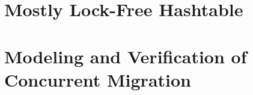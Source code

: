 \documentclass[twoside,12pt]{cslreport}
\begin{document}





\chapter{Mostly Lock-Free Hashtable}
\label{algorithm-details}


\chapter{Modeling and Verification of Concurrent Migration}
\label{verif}


\end{document}

